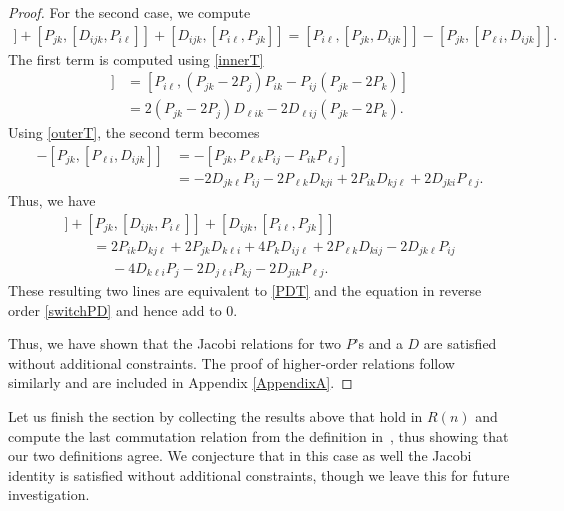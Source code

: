 \documentclass[pdftex]{sigma}
\numberwithin{equation}{section}
\begin{document}
\begin{proof}
For the second case, we compute
\begin{gather*}
  [ P_{i\ell}, [ P_{jk} , D_{ijk}]] + [P_{jk}, [ D_{ijk}, P_{i\ell}]]+ [ D_{ijk}, [P_{i\ell}, P_{jk}]]
 = [ P_{i\ell}, [ P_{jk} , D_{ijk}]] - [ P_{jk}, [ P_{\ell i} , D_{ijk}]].
\end{gather*}
The first term is computed using \eqref{innerT}
\begin{align*}
[ P_{i\ell}, [ P_{jk} , D_{ijk}]]& = [ P_{i\ell},  (P_{jk}-2P_j )P_{ik} - P_{ij} ( P_{jk}-2P_k )] \\
& = 2 (P_{jk}-2P_j )D_{\ell i k} - 2 D_{\ell i j} ( P_{jk}-2P_k ).
\end{align*}
Using \eqref{outerT}, the second term becomes
\begin{align*}
- [ P_{jk}, [ P_{\ell i} , D_{ijk}]] &= - [P_{jk}, P_{\ell k} P_{ij} - P_{ik} P_{\ell j}] \\
&= - 2 D_{jk\ell}P_{ij} -2 P_{\ell k} D_{kji}+2P_{ik}D_{kj\ell}+2 D_{jki} P_{\ell j}.
\end{align*}
Thus, we have
\begin{gather*}
  [ P_{i\ell}, [ P_{jk} , D_{ijk}]] + [P_{jk}, [ D_{ijk}, P_{i\ell}]]+ [ D_{ijk}, [P_{i\ell}, P_{jk}]]\\
\qquad= 2P_{ik}D_{kj\ell} +2P_{jk}D_{k \ell i} +4P_kD_{ij \ell} + 2P_{\ell k} D_{k ij} -2 D_{jk \ell}P_{ij}\\
\phantom{\qquad=}{}- 4 D_{k \ell i}P_j -2D_{j\ell i } P_{ kj}-2D_{j i k}P_{\ell j}.
\end{gather*}
These resulting two lines are equivalent to \eqref{PDT} and the equation in reverse order \eqref{switchPD} and hence add to 0.

Thus, we have shown that the Jacobi relations for two $P$'s and a $D$ are satisfied without additional constraints.
The proof of higher-order relations follow similarly and are included in Appendix \ref{AppendixA}.
\end{proof}

Let us finish the section by collecting the results above that hold in $R(n)$ and compute the last commutation relation from the definition in~\cite{CGPAV22}, thus showing that our two definitions agree. We conjecture that in this case as well the Jacobi identity is satisfied without additional constraints, though we leave this for future investigation.
\end{document}
